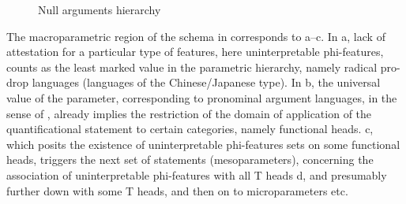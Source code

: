 \documentclass[output=paper]{langsci/langscibook}
\begin{document}
\begin{figure}
    \caption{\label{fig:06.30}Null arguments hierarchy}
\end{figure}

The macroparametric region of the schema in  corresponds to
a--c. In a, lack of
attestation for a particular type of features, here uninterpretable
phi-features, counts as the least marked value in the parametric hierarchy,
namely radical pro-drop languages (languages of the Chinese\slash Japanese type). In
b, the universal value of the parameter, corresponding to
pronominal argument languages, in the sense of \citet{Jelinek1984}, already
implies the restriction of the domain of application of the quantificational
statement to certain categories, namely functional heads.
c, which posits the existence of uninterpretable
phi-features sets on some functional heads, triggers the next set of statements
(mesoparameters), concerning the association of uninterpretable phi-features
with all T heads d, and presumably further down with some T
heads, and then on to microparameters etc.
\end{document}
